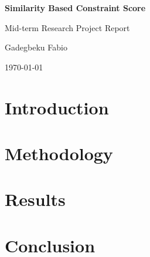 \documentclass[a4paper,12pt]{article}
\begin{document}
\begin{titlepage}
    \centering
    {\huge\bfseries Similarity Based Constraint Score\par}
    \vspace{1cm}
    {\Large Mid-term Research Project Report\par}
    \vspace{1cm}
    {\large Gadegbeku Fabio\par}
    \vspace{1cm}
    \today\par
    \vspace{1cm}
    \hspace{0.2cm}
    \hspace{0.2cm}
    \par
\end{titlepage}

\section{Introduction}

\section{Methodology}

\section{Results}

\section{Conclusion}
\end{document}
